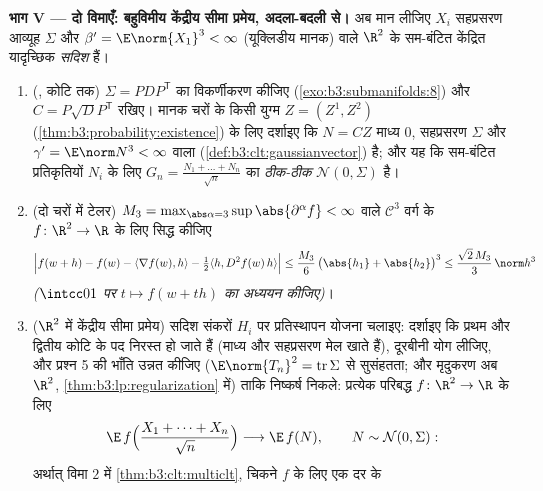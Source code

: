 \begin{problem}[{सप्ताहांत समस्या --- प्रतिस्थापन विधि}]
\medskip
\noindent\textbf{भाग V --- दो विमाएँ: बहुविमीय केंद्रीय सीमा
प्रमेय, अदला-बदली से।} अब मान लीजिए $X_i$ सहप्रसरण आव्यूह $\Sigma$ और
$\beta' = \E\norm{X_1}^3 <
\infty$ (यूक्लिडीय मानक) वाले $\R^2$ के  सम-बंटित केंद्रित
यादृच्छिक \emph{सदिश} हैं।
\begin{enumerate}[resume]
  \item (, कोटि तक) $\Sigma =
        PDP^{\mathsf T}$ का विकर्णीकरण कीजिए (\cref{exo:b3:submanifolds:8})
        और $C = P\sqrt DP^{\mathsf T}$ रखिए।  मानक  चरों के किसी युग्म
        $Z = (Z^1,
        Z^2)$ (\cref{thm:b3:probability:existence}) के लिए दर्शाइए कि $N
        = CZ$ माध्य $0$, सहप्रसरण
        $\Sigma$ और $\gamma' = \E\norm N^3 <
        \infty$ वाला  (\cref{def:b3:clt:gaussianvector}) है; और यह कि
         सम-बंटित प्रतिकृतियों $N_i$ के लिए $G_n = \frac{N_1 + \dots +
        N_n}{\sqrt n}$ का  \emph{ठीक-ठीक} $\mathcal N(0, \Sigma)$ है।
  \item (दो चरों में टेलर) $M_3 =
        \max_{\abs\alpha = 3}\sup\abs{\partial^\alpha f} <
        \infty$ वाले $\mathcal C^3$ वर्ग के $f \colon \R^2 \to
        \R$ के लिए
        सिद्ध कीजिए
        \[
        \Bigl|f(w + h) - f(w) - \langle\nabla f(w),
        h\rangle - \tfrac12\langle h, D^2f(w)\,h\rangle
        \Bigr| \leq \frac{M_3}6\,\bigl(\abs{h_1} +
        \abs{h_2}\bigr)^3 \leq \frac{\sqrt2\,M_3}3\,
        \norm h^3
        \]
        \emph{($\intcc01$ पर $t \mapsto f(w + th)$ का अध्ययन कीजिए)}।
  \item ($\R^2$ में केंद्रीय सीमा प्रमेय) सदिश संकरों $H_i$ पर
        प्रतिस्थापन योजना चलाइए: दर्शाइए कि प्रथम और द्वितीय कोटि
        के पद निरस्त हो जाते हैं (माध्य और सहप्रसरण मेल खाते हैं),
        दूरबीनी योग लीजिए, और प्रश्न 5 की भाँति उन्नत कीजिए ($\E\norm{T_n}^2 =
        \operatorname{tr}\Sigma$
        से सुसंहतता; और मृदुकरण अब $\R^2$, \cref{thm:b3:lp:regularization} में) ताकि निष्कर्ष
        निकले: प्रत्येक परिबद्ध  $f \colon
        \R^2 \to \R$ के लिए
        \[
        \E\,f\Bigl(\frac{X_1 + \dots + X_n}{\sqrt n}\Bigr)
        \longrightarrow \E\,f(N), \qquad N \sim \mathcal
        N(0, \Sigma) :
        \]
        अर्थात् विमा $2$ में \cref{thm:b3:clt:multiclt}, चिकने $f$ के लिए एक दर के

\end{enumerate}
\end{problem}

